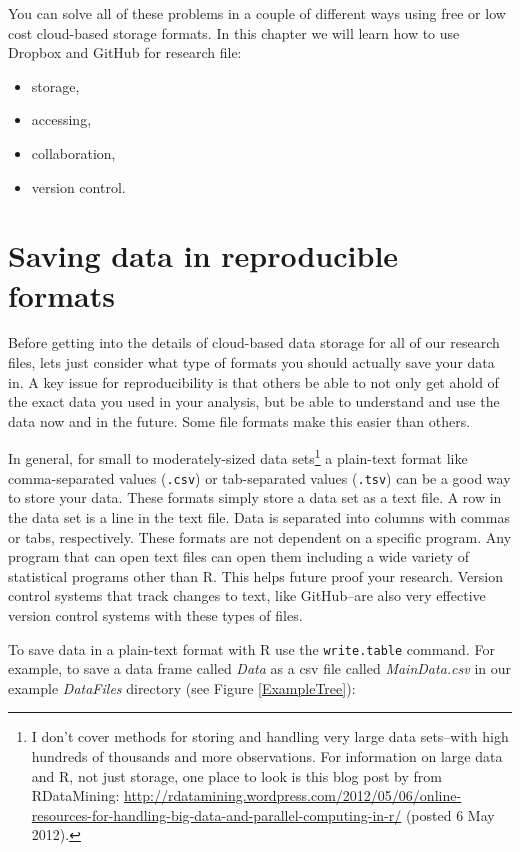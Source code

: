 You can solve all of these problems in a couple of different ways using free or low cost cloud-based storage formats. In this chapter we will learn how to use Dropbox and GitHub for research file:

\begin{itemize}
    \item storage,
    \item accessing,
    \item collaboration,
    \item version control.
\end{itemize}

\section{Saving data in reproducible formats}

Before getting into the details of cloud-based data storage for all of our research files, lets just consider what type of formats you should actually save your data in. A key issue for reproducibility is that others be able to not only get ahold of the exact data you used in your analysis, but be able to understand and use the data now and in the future. Some file formats make this easier than others.

In general, for small to moderately-sized data sets\footnote{I don't cover methods for storing and handling very large data sets--with high hundreds of thousands and more observations. For information on large data and R, not just storage, one place to look is this blog post by from RDataMining: \url{http://rdatamining.wordpress.com/2012/05/06/online-resources-for-handling-big-data-and-parallel-computing-in-r/} (posted 6 May 2012).} a plain-text format like comma-separated values (\texttt{.csv}) or tab-separated values (\texttt{.tsv}) can be a good way to store your data. These formats simply store a data set as a text file. A row in the data set is a line in the text file. Data is separated into columns with commas or tabs, respectively. These formats are not dependent on a specific program. Any program that can open text files can open them including a wide variety of statistical programs other than R. This helps future proof your research. Version control systems that track changes to text, like GitHub--are also very effective version control systems with these types of files. 

To save data in a plain-text format with R use the \texttt{write.table} command. For example, to save a data frame called {\emph{Data}} as a csv file called {\emph{MainData.csv}} in our example {\emph{DataFiles}} directory (see Figure \ref{ExampleTree}):

